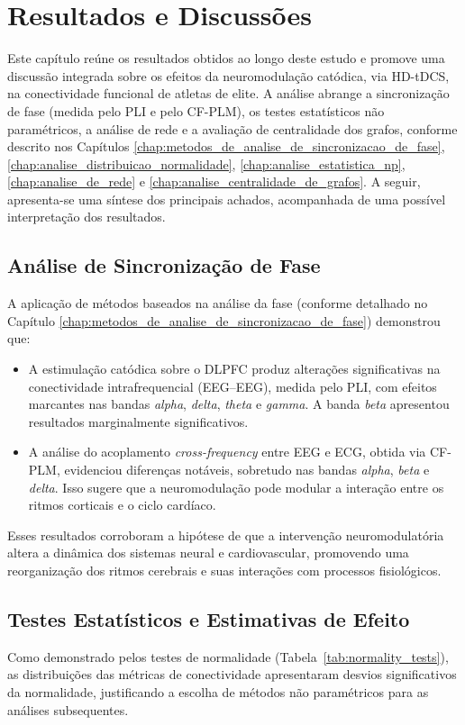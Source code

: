 \chapter{Resultados e Discussões}
\label{chap:resultados_e_discussoes}
Este capítulo reúne os resultados obtidos ao longo deste estudo e promove uma discussão integrada sobre os efeitos da neuromodulação catódica, via HD-tDCS, na conectividade funcional de atletas de elite. A análise abrange a sincronização de fase (medida pelo PLI e pelo CF-PLM), os testes estatísticos não paramétricos, a análise de rede e a avaliação de centralidade dos grafos, conforme descrito nos Capítulos \ref{chap:metodos_de_analise_de_sincronizacao_de_fase}, \ref{chap:analise_distribuicao_normalidade}, \ref{chap:analise_estatistica_np}, \ref{chap:analise_de_rede} e \ref{chap:analise_centralidade_de_grafos}. A seguir, apresenta-se uma síntese dos principais achados, acompanhada de uma possível interpretação dos resultados.

\section{Análise de Sincronização de Fase}
A aplicação de métodos baseados na análise da fase (conforme detalhado no Capítulo \ref{chap:metodos_de_analise_de_sincronizacao_de_fase}) demonstrou que:
\begin{itemize}
    \item A estimulação catódica sobre o DLPFC produz alterações significativas na conectividade intrafrequencial (EEG--EEG), medida pelo PLI, com efeitos marcantes nas bandas \emph{alpha}, \emph{delta}, \emph{theta} e \emph{gamma}. A banda \emph{beta} apresentou resultados marginalmente significativos.
    \item A análise do acoplamento \emph{cross-frequency} entre EEG e ECG, obtida via CF-PLM, evidenciou diferenças notáveis, sobretudo nas bandas \emph{alpha}, \emph{beta} e \emph{delta}. Isso sugere que a neuromodulação pode modular a interação entre os ritmos corticais e o ciclo cardíaco.
\end{itemize}
Esses resultados corroboram a hipótese de que a intervenção neuromodulatória altera a dinâmica dos sistemas neural e cardiovascular, promovendo uma reorganização dos ritmos cerebrais e suas interações com processos fisiológicos.

\section{Testes Estatísticos e Estimativas de Efeito}
Como demonstrado pelos testes de normalidade (Tabela~\ref{tab:normality_tests}), as distribuições das métricas de conectividade apresentaram desvios significativos da normalidade, justificando a escolha de métodos não paramétricos para as análises subsequentes.

